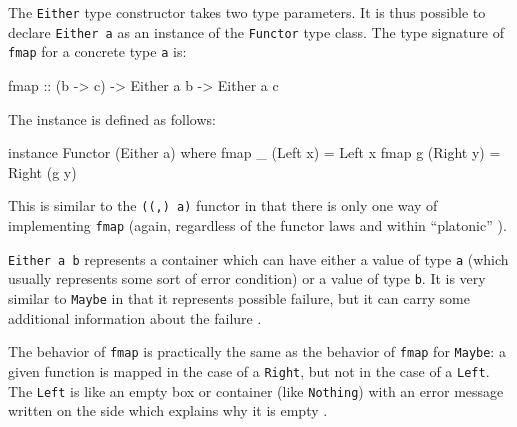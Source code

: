 \begin{example}

  \label{ex:functor-either-haskell}


  The \texttt{Either} type constructor takes two type parameters. It
  is thus possible to declare \texttt{Either a} as an instance of the
  \texttt{Functor} type class. The type signature of \texttt{fmap} for
  a concrete type \texttt{a} is:
  \begin{codehaskell}
    fmap :: (b -> c) -> Either a b -> Either a c
  \end{codehaskell}

  The instance is defined as follows:
  \begin{codehaskell}
    instance Functor (Either a) where
      fmap _ (Left x)  = Left x
      fmap g (Right y) = Right (g y)
  \end{codehaskell}
  This is similar to the \texttt{((,) a)} functor in that there is
  only one way of implementing \texttt{fmap} (again, regardless of the
  functor laws and within ``platonic'' \hask).

  \texttt{Either a b} represents a container which can have either a
  value of type \texttt{a} (which usually represents some sort of
  error condition) or a value of type \texttt{b}. It is very similar
  to \texttt{Maybe} in that it represents possible failure, but it can
  carry some additional information about the failure
  \parencite{yorgey-2009}.

  The behavior of \texttt{fmap} is practically the same as the
  behavior of \texttt{fmap} for \texttt{Maybe}: a given function is
  mapped in the case of a \texttt{Right}, but not in the case of a
  \texttt{Left}. The \texttt{Left} is like an empty box or container
  (like \texttt{Nothing}) with an error message written on the side
  which explains why it is empty \parencite{lipovaca-2011}.


\end{example}
